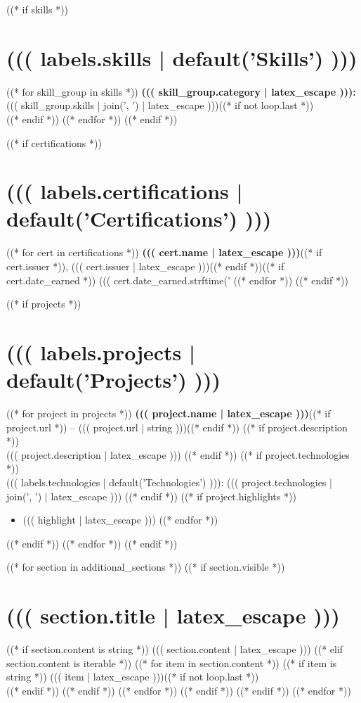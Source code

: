 \documentclass[11pt,letterpaper]{article}
\begin{document}
((* if skills *))
\section{((( labels.skills | default('Skills') )))}
((* for skill_group in skills *))
\textbf{((( skill_group.category | latex_escape ))):} ((( skill_group.skills | join(', ') | latex_escape )))((* if not loop.last *))\\((* endif *))
((* endfor *))
((* endif *))

((* if certifications *))
\section{((( labels.certifications | default('Certifications') )))}
((* for cert in certifications *))
\noindent\textbf{((( cert.name | latex_escape )))}((* if cert.issuer *)), ((( cert.issuer | latex_escape )))((* endif *))((* if cert.date_earned *)) \hfill ((( cert.date_earned.strftime('%
((* endfor *))
((* endif *))

((* if projects *))
\section{((( labels.projects | default('Projects') )))}

((* for project in projects *))
\noindent\textbf{((( project.name | latex_escape )))}((* if project.url *)) -- ((( project.url | string )))((* endif *))
((* if project.description *))
\\((( project.description | latex_escape )))
((* endif *))
((* if project.technologies *))
\\((( labels.technologies | default('Technologies') ))): ((( project.technologies | join(', ') | latex_escape )))
((* endif *))
((* if project.highlights *))
\begin{itemize}
((* for highlight in project.highlights *))
    \item ((( highlight | latex_escape )))
((* endfor *))
\end{itemize}
((* endif *))
((* endfor *))
((* endif *))

((* for section in additional_sections *))
((* if section.visible *))
\section{((( section.title | latex_escape )))}
((* if section.content is string *))
((( section.content | latex_escape )))
((* elif section.content is iterable *))
((* for item in section.content *))
((* if item is string *))
\noindent ((( item | latex_escape )))((* if not loop.last *))\\((* endif *))
((* endif *))
((* endfor *))
((* endif *))
((* endif *))
((* endfor *))
\end{document}
